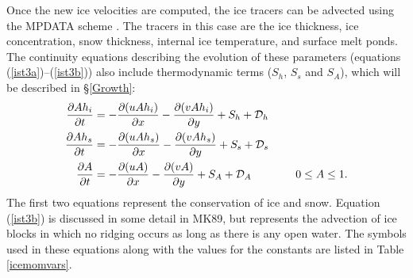 Once the new ice velocities are computed, the ice tracers can be
advected using the MPDATA scheme \citep{Smolark90}. The tracers in
this case are the ice thickness, ice concentration, snow thickness,
internal ice temperature, and surface melt ponds. The continuity
equations describing the evolution of these parameters (equations
(\ref{ist3a})--(\ref{ist3b})) also include thermodynamic terms ($S_h$,
$S_s$ and $S_A$), which will be described in \S\ref{Growth}:
\begin{align}
  \frac{\partial A h_i }{ \partial t} & =
  - \frac{\partial (u A h_i) }{ \partial x} -
  \frac{\partial (v A h_i) }{ \partial y}
  + S_h + {\cal D}_h
\label{ist3a} \\
  \frac{\partial A h_s }{ \partial t} & =
  - \frac{\partial (u A h_s) }{ \partial x} -
  \frac{\partial (v A h_s) }{ \partial y}
  + S_s + {\cal D}_s
\label{ist3c} \\
  \frac{\partial A }{ \partial t} & =
  - \frac{\partial (uA) }{ \partial x} - \frac{\partial (vA) }{ \partial y}
  + S_A + {\cal D}_A \qquad \qquad 0 \leq A \leq 1 .
\label{ist3b}
\end{align}
The first two equations represent the conservation of ice and snow.
Equation (\ref{ist3b}) is discussed in some detail in MK89, but
represents the advection of ice blocks in which no ridging occurs as
long as there is any open water.
%
The symbols used in these equations along with the values for the
constants are listed in Table \ref{icemomvars}.

